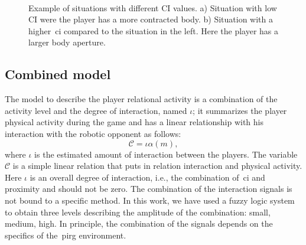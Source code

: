 \begin{figure}[h]
    \centering 
	\begin{subfigure}[h]{0.48\textwidth}
		\centering      
		\caption{}
	\end{subfigure}
	~
	\begin{subfigure}[h]{0.48\textwidth}
		\centering      
      	\caption{}
     \end{subfigure}
      \caption{Example of situations with different CI values. a) Situation with low CI were the player has a more contracted body. b) Situation with a higher~\gls{ci} compared to the situation in the left. Here the player has a larger body aperture.}
      \label{fig:low_high_CI}
\end{figure}

\subsection{Combined model}\label{sec:engagement}
The model to describe the player relational activity is a combination of the activity level and the degree of interaction, named $\iota$; it summarizes the player physical activity during the game and has a linear relationship with his interaction with the robotic opponent as follows: 
\begin{equation}
\label{enagementeq}
\mathcal{C}=\iota \alpha(m),
\end{equation}
where $\iota$ is the estimated amount of interaction between the players. 
The variable $\mathcal{C}$ is a simple linear relation that puts in relation interaction and physical activity. Here $\iota$ is an overall degree of interaction, i.e., the combination of~\gls{ci} and proximity and should not be zero. The combination of the interaction signals is not bound to a specific method. In this work, we have used a fuzzy logic system to obtain three levels describing the amplitude of the combination: small, medium, high. %
In principle, the combination of the signals depends on the specifics of the~\gls{pirg} environment. 

